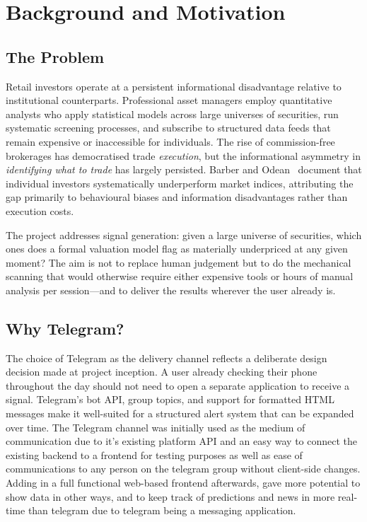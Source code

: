 \documentclass[12pt,a4paper]{article}
\begin{document}
\tableofcontents
\newpage

\section{Background and Motivation}

\subsection{The Problem}

Retail investors operate at a persistent informational disadvantage relative to institutional counterparts. Professional asset managers employ quantitative analysts who apply statistical models across large universes of securities, run systematic screening processes, and subscribe to structured data feeds that remain expensive or inaccessible for individuals. The rise of commission-free brokerages has democratised trade \textit{execution}, but the informational asymmetry in \textit{identifying what to trade} has largely persisted. Barber and Odean~\cite{barber2000} document that individual investors systematically underperform market indices, attributing the gap primarily to behavioural biases and information disadvantages rather than execution costs.

The project addresses signal generation: given a large universe of securities, which ones does a formal valuation model flag as materially underpriced at any given moment? The aim is not to replace human judgement but to do the mechanical scanning that would otherwise require either expensive tools or hours of manual analysis per session---and to deliver the results wherever the user already is.

\subsection{Why Telegram?}

The choice of Telegram as the delivery channel reflects a deliberate design decision made at project inception. A user already checking their phone throughout the day should not need to open a separate application to receive a signal. Telegram's bot API, group topics, and support for formatted HTML messages make it well-suited for a structured alert system that can be expanded over time. The Telegram channel was initially used as the medium of communication due to it's existing platform API and an easy way to connect the existing backend to a frontend for testing purposes as well as ease of communications to any person on the telegram group without client-side changes. Adding in a full functional web-based frontend afterwards, gave more potential to show data in other ways, and to keep track of predictions and news in more real-time than telegram due to telegram being a messaging application.
\end{document}

